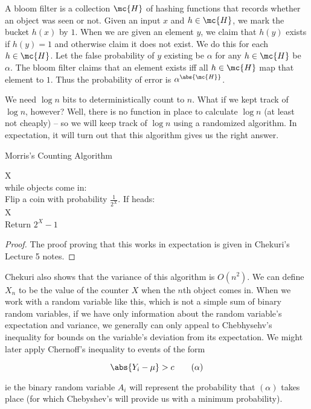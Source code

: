 \documentclass[../main.tex]{subfiles}
\begin{document}
\begin{definition}
    A bloom filter is a collection $\mc{H}$ of hashing functions that records whether an object was seen or not. Given an input $x$ and $h \in \mc{H}$, we mark the bucket $h(x)$ by $1$. When we are given an element $y$, we claim that $h(y)$ exists if $h(y) = 1$ and otherwise claim it does not exist. We do this for each $h \in \mc{H}$. Let the false probability of $y$ existing be $\alpha$ for any $h \in \mc{H}$ be $\alpha$. The bloom filter claims that an element exists iff all $h \in \mc{H}$ map that element to $1$. Thus the probability of error is $\alpha^{\abs{\mc{H}}}$.
\end{definition}


\begin{remark}
    We need $\log n$ bits to deterministically count to $n$. What if we kept track of $\log n$, however? Well, there is no function in place to calculate $\log n$ (at least not cheaply) -- so we will keep track of $\log n$ using a randomized algorithm. In expectation, it will turn out that this algorithm gives us the right answer.
\end{remark}

\begin{definition}{Morris's Counting Algorithm}

    \begin{algo}
        X  \\
        while objects come in: \+\\
        Flip a coin with probability $\frac{1}{2^{X}}$.
        If heads: \+\\
        X  \-\-\\
        Return $2^{X} - 1$ \\
    \end{algo}
    
\end{definition}
\begin{proof}
    The proof proving that this works in expectation is
    given in Chekuri's Lecture 5 notes.
\end{proof}

\begin{remark}
    Chekuri also shows that the variance of this algorithm is $O(n^2)$. We can define $X_n$ to be the value of the counter $X$ when the $n$th object comes in. When we work with a random variable like this, which is not a simple sum of binary random variables, if we have only information about the random variable's expectation and variance, we generally can only appeal to Chebhysehv's inequality for bounds on the variable's deviation from its expectation. We might later apply Chernoff's inequality to events of the form

    \[
        \abs{Y_{i} - \mu} > c \tag{$\alpha$}
    \]

    ie the binary random variable $A_{i}$ will represent the probability that $(\alpha)$ takes place (for which Chebyshev's will provide us with a minimum probability).
\end{remark}
\end{document}
